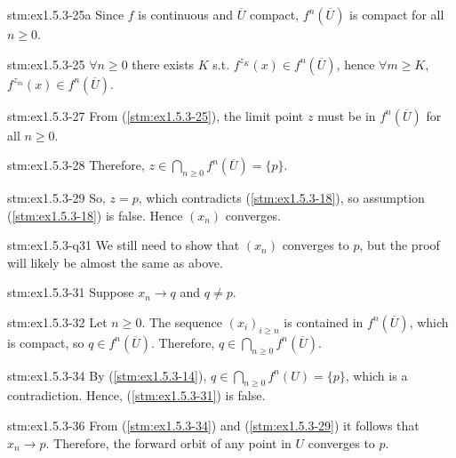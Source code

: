 \begin{statement}{stm:ex1.5.3-25a}
Since $f$ is continuous and $\overline{U}$ compact, $f^n(\overline{U})$ is compact for all $n \ge 0$. 
\end{statement}

\begin{statement}{stm:ex1.5.3-25}
$\forall n \ge 0$ there exists $K$ s.t. $f^{z_K}(x) \in f^n(\overline{U})$, hence $\forall m \ge K$, $f^{z_m}(x) \in f^n(\overline{U})$.
\end{statement}

\begin{statement}{stm:ex1.5.3-27}
From (\ref{stm:ex1.5.3-25}), the limit point $z$ must be in $f^n(\overline{U})$ for all $n \ge 0$.
\end{statement}

\begin{statement}{stm:ex1.5.3-28}
Therefore, $z \in \bigcap_{n \ge 0} f^n(\overline{U}) = \{p\}$.
\end{statement}

\begin{statement}{stm:ex1.5.3-29}
So, $z = p$, which contradicts (\ref{stm:ex1.5.3-18}), so assumption (\ref{stm:ex1.5.3-18}) is false. Hence $(x_n)$ converges.
\end{statement}

\begin{explanation}{stm:ex1.5.3-q31}
We still need to show that $(x_n)$ converges to $p$, but the proof will likely be almost the same as above.
\end{explanation}

\begin{statement}{stm:ex1.5.3-31}
Suppose $x_n \to q$ and $q \ne p$.
\end{statement}

\begin{statement}{stm:ex1.5.3-32}
Let $n \ge 0$. The sequence $(x_i)_{i \ge n}$ is contained in $f^n(\overline{U})$, which is compact, so $q \in f^n(\overline{U})$. Therefore, $q \in \bigcap_{n \ge 0} f^n(\overline{U})$.
\end{statement}

\begin{statement}{stm:ex1.5.3-34}
By (\ref{stm:ex1.5.3-14}), $q \in \bigcap_{n \ge 0} f^n(U) = \{p\}$, which is a contradiction. Hence, (\ref{stm:ex1.5.3-31}) is false.
\end{statement}

\begin{statement}{stm:ex1.5.3-36}
From (\ref{stm:ex1.5.3-34}) and (\ref{stm:ex1.5.3-29}) it follows that $x_n \to p$. Therefore, the forward orbit of any point in $U$ converges to $p$.
\end{statement}